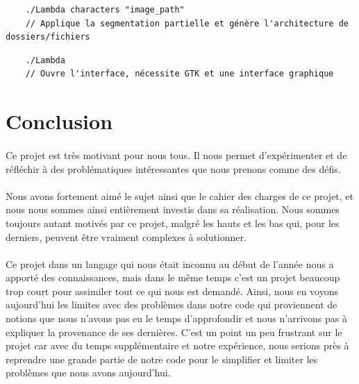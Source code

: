 \documentclass{article}
\begin{document}
\begin{lstlisting}
	./Lambda characters "image_path"
	// Applique la segmentation partielle et génère l'architecture de dossiers/fichiers
\end{lstlisting}

\begin{lstlisting}
	./Lambda
	// Ouvre l'interface, nécessite GTK et une interface graphique
\end{lstlisting}


\newpage
{}
\section{Conclusion}

\paragraph{}Ce projet est très motivant pour nous tous. Il nous permet d'expérimenter et de réfléchir à des problématiques intéressantes que nous prenons comme des défis. 

\paragraph{}Nous avons fortement aimé le sujet ainsi que le cahier des charges de ce projet, et nous nous sommes ainsi entièrement investis dans sa réalisation. Nous sommes toujours autant motivés par ce projet, malgré les hauts et les bas qui, pour les derniers, peuvent être vraiment complexes à solutionner.\\

\paragraph{}Ce projet dans un langage qui nous était inconnu au début de l'année nous a apporté des connaissances, mais dans le même temps c'est un projet beaucoup trop court pour assimiler tout ce qui nous est demandé. Ainsi, nous en voyons aujourd'hui les limites avec des problèmes dans notre code qui proviennent de notions que nous n'avons pas eu le temps d'approfondir et nous n'arrivons pas à expliquer la provenance de ses dernières. C'est un point un peu frustrant sur le projet car avec du temps supplémentaire et notre expérience, nous serions près à reprendre une grande partie de notre code pour le simplifier et limiter les problèmes que nous avons aujourd'hui.


\newpage
\end{document}
